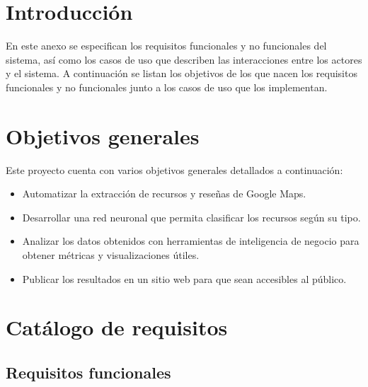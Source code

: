 
\section{Introducción}

En este anexo se especifican los requisitos funcionales y no funcionales del sistema, así como los casos de uso que describen las interacciones entre los actores y el sistema.
A continuación se listan los objetivos de los que nacen los requisitos funcionales y no funcionales junto a los casos de uso que los implementan.

\section{Objetivos generales}

Este proyecto cuenta con varios objetivos generales detallados a continuación:

\begin{itemize}
	\item Automatizar la extracción de recursos y reseñas de Google Maps.
	\item Desarrollar una red neuronal que permita clasificar los recursos según su tipo.
	\item Analizar los datos obtenidos con herramientas de inteligencia de negocio para obtener métricas y visualizaciones útiles.
	\item Publicar los resultados en un sitio web para que sean accesibles al público.
\end{itemize}

\section{Catálogo de requisitos}

\subsection{Requisitos funcionales}

